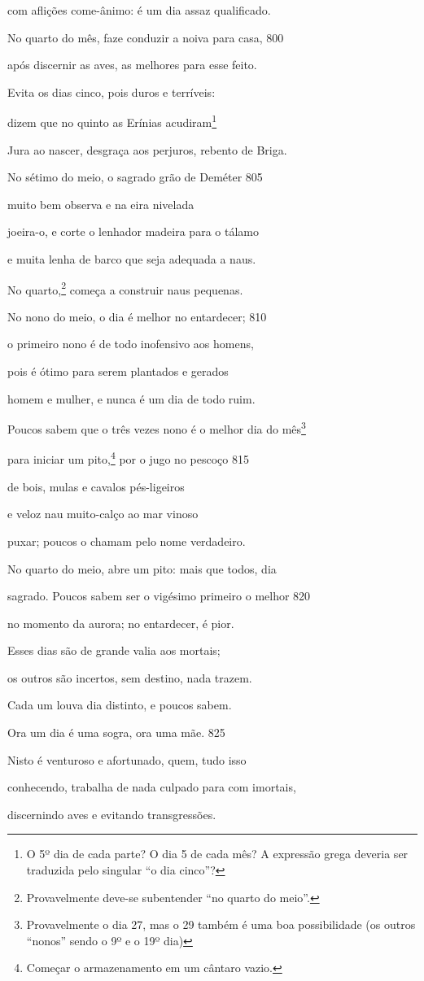 com aflições come-ânimo: é um dia assaz qualificado.

No quarto do mês, faze conduzir a noiva para casa, \num{800}

após discernir as aves, as melhores para esse feito.

Evita os dias cinco, pois duros e terríveis:

dizem que no quinto as Erínias acudiram\footnote{O 5º dia de cada parte? O dia 5 de cada mês? A expressão grega deveria ser traduzida pelo singular ``o dia cinco''?}

Jura ao nascer, desgraça aos perjuros, rebento de Briga.

No sétimo do meio, o sagrado grão de Deméter \num{805}

muito bem observa e na eira nivelada

joeira-o, e corte o lenhador madeira para o tálamo

e muita lenha de barco que seja adequada a naus.

No quarto,\footnote{Provavelmente deve-se subentender ``no quarto do meio''.} começa a construir naus pequenas.

No nono do meio, o dia é melhor no entardecer; \num{810}

o primeiro nono é de todo inofensivo aos homens,

pois é ótimo para serem plantados e gerados

homem e mulher, e nunca é um dia de todo ruim.

Poucos sabem que o três vezes nono é o melhor dia do mês\footnote{Provavelmente o dia 27, mas o 29 também é uma boa possibilidade (os
outros ``nonos'' sendo o 9º e o 19º dia)}

para iniciar um pito,\footnote{Começar o armazenamento em um cântaro vazio.} por o jugo no pescoço \num{815}

de bois, mulas e cavalos pés-ligeiros

e veloz nau muito-calço ao mar vinoso

puxar; poucos o chamam pelo nome verdadeiro.

No quarto do meio, abre um pito: mais que todos, dia

sagrado. Poucos sabem ser o vigésimo primeiro o melhor \num{820}

no momento da aurora; no entardecer, é pior.

Esses dias são de grande valia aos mortais;

os outros são incertos, sem destino, nada trazem.

Cada um louva dia distinto, e poucos sabem.

Ora um dia é uma sogra, ora uma mãe. \num{825}

Nisto é venturoso e afortunado, quem, tudo isso

conhecendo, trabalha de nada culpado para com imortais,

discernindo aves e evitando transgressões.
